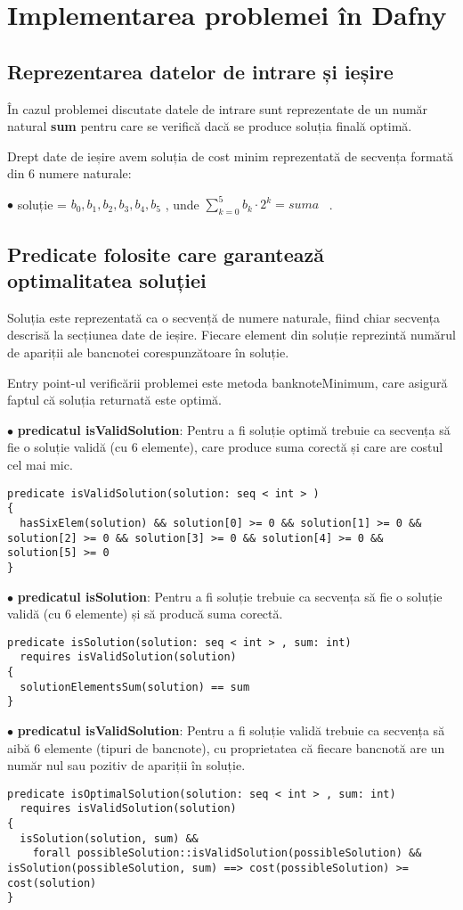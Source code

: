 \chapter{Implementarea problemei în Dafny}


\section{ Reprezentarea datelor de intrare și ieșire }
În cazul problemei discutate datele de intrare sunt reprezentate de un număr natural \textbf{sum} 
pentru care se verifică dacă se produce soluția finală optimă.

Drept date de ieșire avem soluția de cost minim reprezentată de secvența formată din 6 numere naturale: \par
$\bullet$ soluție  = { $b_{0}, b_{1}, b_{2}, b_{3}, b_{4}, b_{5}$} , unde $\sum_{k=0}^{5} b_{k} \cdot 2^{k} = suma $ ~\cite{jared:1}.

\section{ Predicate folosite care garantează optimalitatea soluției}
Soluția este reprezentată ca o secvență de numere naturale, fiind chiar secvența descrisă la secțiunea date de ieșire.
Fiecare element din soluție reprezintă numărul de apariții ale bancnotei corespunzătoare în soluție.\par
Entry point-ul verificării  problemei este metoda banknoteMinimum, care asigură faptul că soluția returnată este optimă.

$\bullet$ \textbf{predicatul isValidSolution}: Pentru a fi soluție optimă trebuie ca secvența să fie o soluție validă (cu 6 elemente), 
care produce suma corectă și care are costul cel mai mic.\par
\begin{lstlisting}
predicate isValidSolution(solution: seq < int > ) 
{
  hasSixElem(solution) && solution[0] >= 0 && solution[1] >= 0 && solution[2] >= 0 && solution[3] >= 0 && solution[4] >= 0 && solution[5] >= 0
}
\end{lstlisting}

$\bullet$ \textbf{predicatul isSolution}: Pentru a fi soluție trebuie ca secvența să fie o soluție validă (cu 6 elemente) și
să producă suma corectă.\par
\begin{lstlisting}
predicate isSolution(solution: seq < int > , sum: int)
  requires isValidSolution(solution) 
{
  solutionElementsSum(solution) == sum
}
\end{lstlisting}

$\bullet$ \textbf{predicatul isValidSolution}: Pentru a fi soluție validă trebuie ca secvența să aibă 6 elemente (tipuri de bancnote), cu 
proprietatea că fiecare bancnotă are un număr nul sau pozitiv de apariții în soluție.\par
\begin{lstlisting}
predicate isOptimalSolution(solution: seq < int > , sum: int)
  requires isValidSolution(solution) 
{
  isSolution(solution, sum) &&
    forall possibleSolution::isValidSolution(possibleSolution) && isSolution(possibleSolution, sum) ==> cost(possibleSolution) >= cost(solution)
}
\end{lstlisting}